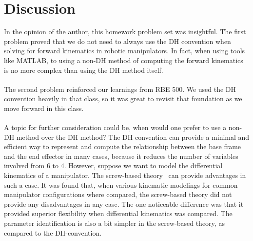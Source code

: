 \documentclass[conference]{IEEEtran}
\begin{document}
\section{Discussion}
In the opinion of the author, this homework problem set was insightful. The
first problem proved that we do not need to always use the DH convention
when solving for forward kinematics in robotic manipulators. In fact, when
using tools like MATLAB, to using a non-DH method of
computing the forward kinematics is no more complex than using the DH method
itself.\\\\
The second problem reinforced our learnings from RBE 500. We used the DH
convention heavily in that class, so it was great to revisit that foundation
as we move forward in this class.\\\\
A topic for further consideration could be, when would one prefer to use
a non-DH method over the DH method? The DH convention can provide a minimal
and efficient way to represent and compute the relationship between the base
frame and the end effector in many cases, because it reduces the number of
variables involved from 6 to 4. However, suppose we want to model the
differential kinematics of a manipulator. The screw-based theory~\cite{Rocha2011}
can provide advantages in such a case. It was found that, when
various kinematic modelings for common manipulator configurations where
compared, the screw-based theory did not provide any disadvantages in any
case. The one noticeable difference was that it provided superior flexibility
when differential kinematics was compared.
The parameter identification is also a bit simpler in the screw-based theory, as
compared to the DH-convention.


\end{document}
